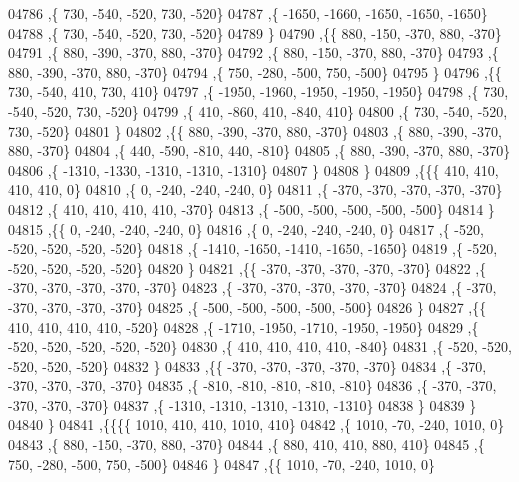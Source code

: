 \begin{DoxyCode}
04786     ,\{   730,  -540,  -520,   730,  -520\}
04787     ,\{ -1650, -1660, -1650, -1650, -1650\}
04788     ,\{   730,  -540,  -520,   730,  -520\}
04789     \}
04790    ,\{\{   880,  -150,  -370,   880,  -370\}
04791     ,\{   880,  -390,  -370,   880,  -370\}
04792     ,\{   880,  -150,  -370,   880,  -370\}
04793     ,\{   880,  -390,  -370,   880,  -370\}
04794     ,\{   750,  -280,  -500,   750,  -500\}
04795     \}
04796    ,\{\{   730,  -540,   410,   730,   410\}
04797     ,\{ -1950, -1960, -1950, -1950, -1950\}
04798     ,\{   730,  -540,  -520,   730,  -520\}
04799     ,\{   410,  -860,   410,  -840,   410\}
04800     ,\{   730,  -540,  -520,   730,  -520\}
04801     \}
04802    ,\{\{   880,  -390,  -370,   880,  -370\}
04803     ,\{   880,  -390,  -370,   880,  -370\}
04804     ,\{   440,  -590,  -810,   440,  -810\}
04805     ,\{   880,  -390,  -370,   880,  -370\}
04806     ,\{ -1310, -1330, -1310, -1310, -1310\}
04807     \}
04808    \}
04809   ,\{\{\{   410,   410,   410,   410,     0\}
04810     ,\{     0,  -240,  -240,  -240,     0\}
04811     ,\{  -370,  -370,  -370,  -370,  -370\}
04812     ,\{   410,   410,   410,   410,  -370\}
04813     ,\{  -500,  -500,  -500,  -500,  -500\}
04814     \}
04815    ,\{\{     0,  -240,  -240,  -240,     0\}
04816     ,\{     0,  -240,  -240,  -240,     0\}
04817     ,\{  -520,  -520,  -520,  -520,  -520\}
04818     ,\{ -1410, -1650, -1410, -1650, -1650\}
04819     ,\{  -520,  -520,  -520,  -520,  -520\}
04820     \}
04821    ,\{\{  -370,  -370,  -370,  -370,  -370\}
04822     ,\{  -370,  -370,  -370,  -370,  -370\}
04823     ,\{  -370,  -370,  -370,  -370,  -370\}
04824     ,\{  -370,  -370,  -370,  -370,  -370\}
04825     ,\{  -500,  -500,  -500,  -500,  -500\}
04826     \}
04827    ,\{\{   410,   410,   410,   410,  -520\}
04828     ,\{ -1710, -1950, -1710, -1950, -1950\}
04829     ,\{  -520,  -520,  -520,  -520,  -520\}
04830     ,\{   410,   410,   410,   410,  -840\}
04831     ,\{  -520,  -520,  -520,  -520,  -520\}
04832     \}
04833    ,\{\{  -370,  -370,  -370,  -370,  -370\}
04834     ,\{  -370,  -370,  -370,  -370,  -370\}
04835     ,\{  -810,  -810,  -810,  -810,  -810\}
04836     ,\{  -370,  -370,  -370,  -370,  -370\}
04837     ,\{ -1310, -1310, -1310, -1310, -1310\}
04838     \}
04839    \}
04840   \}
04841  ,\{\{\{\{  1010,   410,   410,  1010,   410\}
04842     ,\{  1010,   -70,  -240,  1010,     0\}
04843     ,\{   880,  -150,  -370,   880,  -370\}
04844     ,\{   880,   410,   410,   880,   410\}
04845     ,\{   750,  -280,  -500,   750,  -500\}
04846     \}
04847    ,\{\{  1010,   -70,  -240,  1010,     0\}

\end{DoxyCode}
